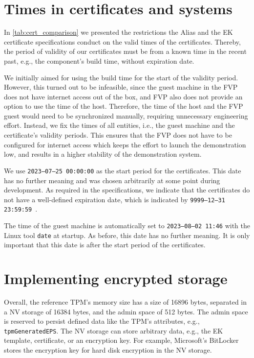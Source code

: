 \section{Times in certificates and systems}

In \autoref{tab:cert_comparison} we presented the restrictions the Alias and the EK certificate specifications conduct on the valid times of the certificates.
Thereby, the period of validity of our certificates must be from a known time in the recent past, e.g., the component's build time, without expiration date.

We initially aimed for using the build time for the start of the validity period.
However, this turned out to be infeasible, since the guest machine in the FVP does not have internet access out of the box, and FVP also does not provide an option to use the time of the host.
Therefore, the time of the host and the FVP guest would need to be synchronized manually, requiring unnecessary engineering effort.
Instead, we fix the times of all entities, i.e., the guest machine and the certificate's validity periods.
This ensures that the FVP does not have to be configured for internet access which keeps the effort to launch the demonstration low, and results in a higher stability of the demonstration system.

We use \texttt{2023--07--25 00:00:00} as the start period for the certificates.
This date has no further meaning and was chosen arbitrarily at some point during development.
As required in the specifications, we indicate that the certificates do not have a well-defined expiration date, which is indicated by \texttt{9999--12--31 23:59:59}~\cite{Boeyen2008}.

The time of the guest machine is automatically set to \texttt{2023--08--02 11:46} with the Linux tool \texttt{date} at startup.
As before, this date has no further meaning.
It is only important that this date is after the start period of the certificates.

\section{Implementing encrypted storage}

Overall, the reference TPM's memory size has a size of 16896 bytes, separated in a NV storage of 16384 bytes, and the admin space of 512 bytes.
The admin space is reserved to persist defined data like the TPM's attributes, e.g., \texttt{tpmGeneratedEPS}.
The NV storage can store arbitrary data, e.g., the EK template, certificate, or an encryption key.
For example, Microsoft's BitLocker stores the encryption key for hard disk encryption in the NV storage.

